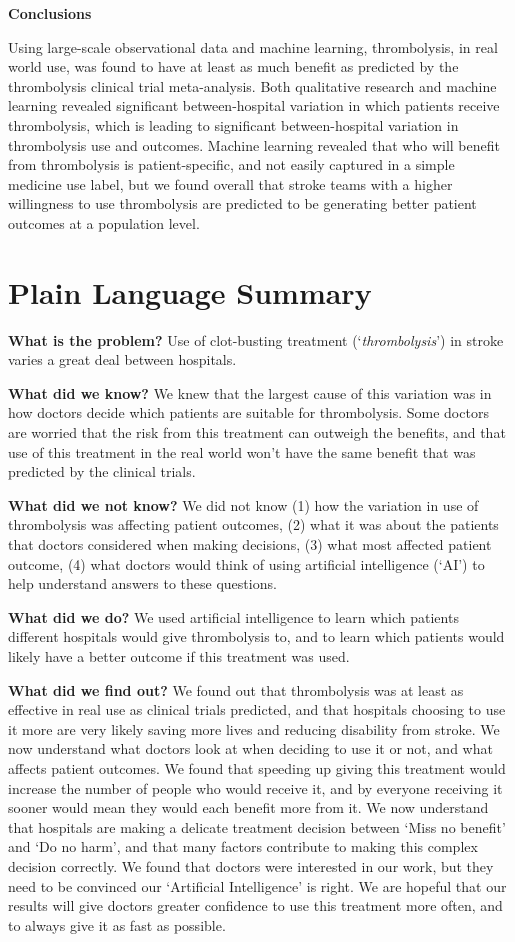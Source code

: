 \textbf{Conclusions}

Using large-scale observational data and machine learning, thrombolysis, in real world use, was found to have at least as much benefit as predicted by the thrombolysis clinical trial meta-analysis. Both qualitative research and machine learning revealed significant between-hospital variation in which patients receive thrombolysis, which is leading to significant between-hospital variation in thrombolysis use and outcomes. Machine learning revealed that who will benefit from thrombolysis is patient-specific, and not easily captured in a simple medicine use label, but we found overall that stroke teams with a higher willingness to use thrombolysis are predicted to be generating better patient outcomes at a population level.

\section*{Plain Language Summary}

\textbf{What is the problem?} Use of clot-busting treatment (`\textit{thrombolysis}') in stroke varies a great deal between hospitals.

\textbf{What did we know?} We knew that the largest cause of this variation was in how doctors decide which patients are suitable for thrombolysis. Some doctors are worried that the risk from this treatment can outweigh the benefits, and that use of this treatment in the real world won’t have the same benefit that was predicted by the clinical trials.

\textbf{What did we not know?} We did not know (1) how the variation in use of thrombolysis was affecting patient outcomes, (2) what it was about the patients that doctors considered when making decisions, (3) what most affected patient outcome, (4) what doctors would think of using artificial intelligence (`AI') to help understand answers to these questions.

\textbf{What did we do?} We used artificial intelligence to learn which patients different hospitals would give thrombolysis to, and to learn which patients would likely have a better outcome if this treatment was used.

\textbf{What did we find out?} We found out that thrombolysis was at least as effective in real use as clinical trials predicted, and that hospitals choosing to use it more are very likely saving more lives and reducing disability from stroke. We now understand what doctors look at when deciding to use it or not, and what affects patient outcomes. We found that speeding up giving this treatment would increase the number of people who would receive it, and by everyone receiving it sooner would mean they would each benefit more from it. We now understand that hospitals are making a delicate treatment decision between ‘Miss no benefit’ and ‘Do no harm’, and that many factors contribute to making this complex decision correctly. We found that doctors were interested in our work, but they need to be convinced our ‘Artificial Intelligence’ is right. We are hopeful that our results will give doctors greater confidence to use this treatment more often, and to always give it as fast as possible.